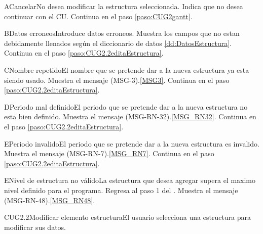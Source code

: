 	\begin{UCtrayectoriaA}{A}{Cancelar}{No desea modificar la estructura seleccionada.}
		\UCpaso[\UCactor] Indica que no desea continuar con el CU.
		\UCpaso Continua en el paso \ref{paso:CUG2gantt}.
	\end{UCtrayectoriaA}

	\begin{UCtrayectoriaA}{B}{Datos erroneos}{Introduce datos erroneos.}
		\UCpaso Muestra los campos que no estan debidamente llenados según el diccionario de datos \ref{dd:DatosEstructura}.
		\UCpaso Continua en el paso \ref{paso:CUG2.2editaEstructura}.
	\end{UCtrayectoriaA}

	\begin{UCtrayectoriaA}{C}{Nombre repetido}{El nombre que se pretende dar a la nueva estructura ya esta siendo usado.}
		\UCpaso Muestra el mensaje (MSG-3).\ref{MSG3}.
		\UCpaso Continua en el paso \ref{paso:CUG2.2editaEstructura}.
	\end{UCtrayectoriaA}

	\begin{UCtrayectoriaA}{D}{Periodo mal definido}{El periodo que se pretende dar a la nueva estructura no esta bien definido.}
		\UCpaso Muestra el mensaje (MSG-RN-32).\ref{MSG_RN32}.
		\UCpaso Continua en el paso \ref{paso:CUG2.2editaEstructura}.
	\end{UCtrayectoriaA}

	\begin{UCtrayectoriaA}{E}{Periodo invalido}{El periodo que se pretende dar a la nueva estructura es invalido.}
		\UCpaso Muestra el mensaje (MSG-RN-7).\ref{MSG_RN7}.
		\UCpaso Continua en el paso \ref{paso:CUG2.2editaEstructura}.
	\end{UCtrayectoriaA}

	\begin{UCtrayectoriaA}{E}{Nivel de estructura no válido}{La estructura que desea agregar supera el maximo nivel definido para el programa.}
		\UCpaso Regresa al paso 1 del .
		\UCpaso Muestra el mensaje (MSG-RN-48).\ref{MSG_RN48}.
	\end{UCtrayectoriaA}

	\begin{UseCase}{CUG2.2}{Modificar elemento estructura}{El usuario selecciona una estructura para modificar sus datos.}
	\end{UseCase}

